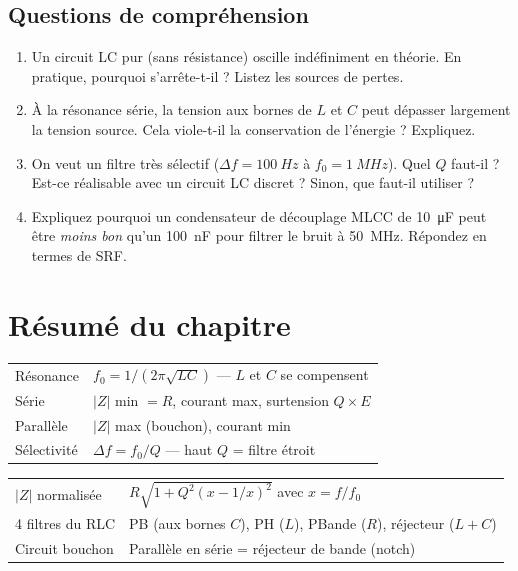 \documentclass[12pt,a4paper,twoside]{book}
\begin{document}
\subsection*{Questions de compréhension}

\begin{enumerate}[nosep]
\item Un circuit LC pur (sans résistance) oscille indéfiniment en théorie. En pratique, pourquoi s'arrête-t-il ? Listez les sources de pertes.
\item À la résonance série, la tension aux bornes de $L$ et $C$ peut dépasser largement la tension source. Cela viole-t-il la conservation de l'énergie ? Expliquez.
\item On veut un filtre très sélectif ($\Delta f = \SI{100}{Hz}$ à $f_0 = \SI{1}{MHz}$). Quel $Q$ faut-il ? Est-ce réalisable avec un circuit LC discret ? Sinon, que faut-il utiliser ?
\item Expliquez pourquoi un condensateur de découplage MLCC de \SI{10}{\micro F} peut être \textit{moins bon} qu'un \SI{100}{nF} pour filtrer le bruit à \SI{50}{MHz}. Répondez en termes de SRF.
\end{enumerate}

\section*{Résumé du chapitre}

\begin{bases}[title={\color{white} Résumé --- Les Bases}]
\begin{center}
\renewcommand{\arraystretch}{1.3}
\begin{tabular}{p{4cm}p{9cm}}
\toprule
Résonance & $f_0 = 1/(2\pi\sqrt{LC})$ --- $L$ et $C$ se compensent \\
Série & $|Z|$ min $= R$, courant max, surtension $Q \times E$ \\
Parallèle & $|Z|$ max (bouchon), courant min \\
Sélectivité & $\Delta f = f_0/Q$ --- haut $Q$ = filtre étroit \\
\bottomrule
\end{tabular}
\end{center}
\end{bases}

\begin{approfondissement}[title={\color{white} Résumé --- Approfondissement}]
\begin{center}
\renewcommand{\arraystretch}{1.3}
\begin{tabular}{p{4cm}p{9cm}}
\toprule
$|Z|$ normalisée & $R\sqrt{1+Q^2(x-1/x)^2}$ avec $x = f/f_0$ \\
4 filtres du RLC & PB (aux bornes $C$), PH ($L$), PBande ($R$), réjecteur ($L+C$) \\
Circuit bouchon & Parallèle en série = réjecteur de bande (notch) \\
\bottomrule
\end{tabular}
\end{center}
\end{approfondissement}
\end{document}
